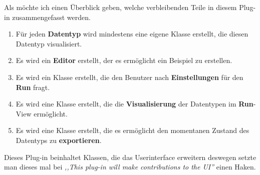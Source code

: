 \documentclass[10pt,a4paper]{article}
\begin{document}
Als möchte ich einen Überblick geben, welche verbleibenden Teile in diesem Plug-in zusammengefasst werden.

\begin{enumerate}
\item Für jeden \textbf{Datentyp} wird mindestens eine eigene Klasse erstellt, die diesen Datentyp visualisiert.

\item Es wird ein \textbf{Editor} erstellt, der es ermöglicht ein Beispiel zu erstellen.

\item Es wird ein Klasse erstellt, die den Benutzer nach \textbf{Einstellungen} für den \textbf{Run} fragt.

\item Es wird eine Klasse erstellt, die die \textbf{Visualisierung} der Datentypen im \textbf{Run}-View ermöglicht.

\item Es wird eine Klasse erstellt, die es ermöglicht den momentanen Zustand des Datentyps zu \textbf{exportieren}.

 
\end{enumerate}

Dieses Plug-in beinhaltet Klassen, die das Userinterface erweitern deswegen setzte man dieses mal bei \emph{,,This plug-in will make contributions to the UI''} einen Haken.
\end{document}
